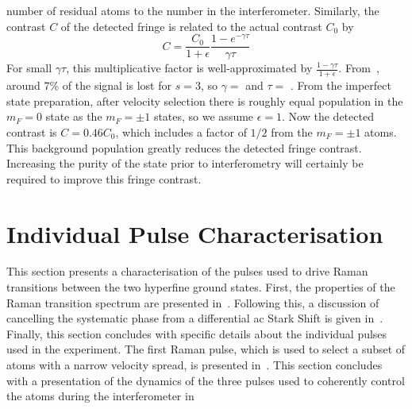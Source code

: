 number of residual atoms to the number in the interferometer.
Similarly, the contrast $C$ of the detected fringe is related to the
actual contrast $C_0$ by 
\begin{equation}
  C = \frac{C_0}{1+\epsilon}\frac{1-e^{-\gamma \tau}}{\gamma \tau}
  \label{eq:contrast}
\end{equation}
For small $\gamma \tau$, this multiplicative factor is
well-approximated by $\frac{1-\gamma \tau}{1+\epsilon}$. 
From~, around 7\% of the signal is lost
for \(s = 3\), so $\gamma = $  and $\tau =$
. From the imperfect state preparation, after
velocity selection there is roughly equal population in the $m_F = 0$
state as the $m_F = \pm 1$ states, so we assume $\epsilon = 1$. 
Now the detected contrast is $C = 0.46 C_0$, which includes a factor
of $1/2$ from the $m_F = \pm 1$ atoms. This background population
greatly reduces the detected fringe contrast. Increasing the purity of
the state prior to interferometry will certainly be required to
improve this fringe contrast. 
\section{Individual Pulse Characterisation} \label{sec:atomint_rabiosc}
This section presents a characterisation of the pulses used to drive
Raman transitions between the two hyperfine ground states. First, the
properties of the Raman transition spectrum are presented
in~. Following this, a discussion of
cancelling the systematic phase from a differential ac Stark Shift is
given in~. Finally, this section
concludes with specific details about the individual pulses used in
the experiment. The first Raman pulse, which is used to select a
subset of atoms with a narrow velocity spread, is presented
in~. This section concludes with a presentation
of the dynamics of the three pulses used to coherently control the
atoms during the interferometer in~
